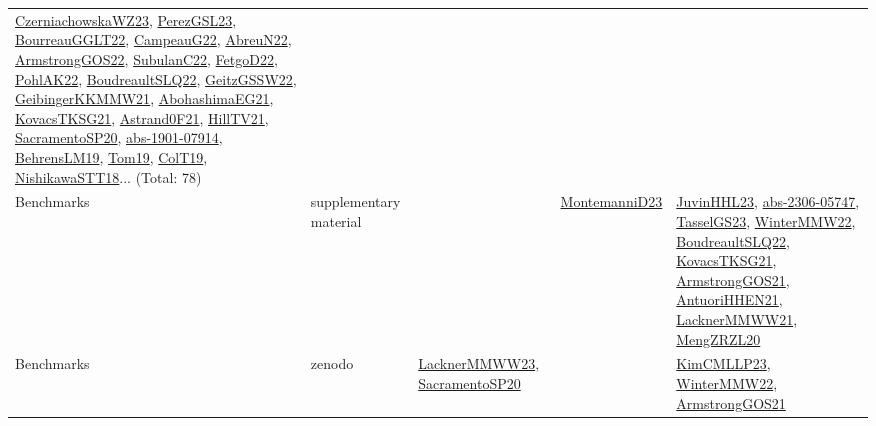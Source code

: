 {\begin{longtable}{lp{3cm}>{\raggedright}p{6cm}>{\raggedright}p{6cm}p{8cm}}
\href{articles/CzerniachowskaWZ23.pdf}{CzerniachowskaWZ23}\cite{CzerniachowskaWZ23}, \href{papers/PerezGSL23.pdf}{PerezGSL23}\cite{PerezGSL23}, \href{articles/BourreauGGLT22.pdf}{BourreauGGLT22}\cite{BourreauGGLT22}, \href{articles/CampeauG22.pdf}{CampeauG22}\cite{CampeauG22}, \href{articles/AbreuN22.pdf}{AbreuN22}\cite{AbreuN22}, \href{papers/ArmstrongGOS22.pdf}{ArmstrongGOS22}\cite{ArmstrongGOS22}, \href{articles/SubulanC22.pdf}{SubulanC22}\cite{SubulanC22}, \href{articles/FetgoD22.pdf}{FetgoD22}\cite{FetgoD22}, \href{articles/PohlAK22.pdf}{PohlAK22}\cite{PohlAK22}, \href{papers/BoudreaultSLQ22.pdf}{BoudreaultSLQ22}\cite{BoudreaultSLQ22}, \href{papers/GeitzGSSW22.pdf}{GeitzGSSW22}\cite{GeitzGSSW22}, \href{papers/GeibingerKKMMW21.pdf}{GeibingerKKMMW21}\cite{GeibingerKKMMW21}, \href{articles/AbohashimaEG21.pdf}{AbohashimaEG21}\cite{AbohashimaEG21}, \href{papers/KovacsTKSG21.pdf}{KovacsTKSG21}\cite{KovacsTKSG21}, \href{papers/Astrand0F21.pdf}{Astrand0F21}\cite{Astrand0F21}, \href{papers/HillTV21.pdf}{HillTV21}\cite{HillTV21}, \href{articles/SacramentoSP20.pdf}{SacramentoSP20}\cite{SacramentoSP20}, \href{articles/abs-1901-07914.pdf}{abs-1901-07914}\cite{abs-1901-07914}, \href{papers/BehrensLM19.pdf}{BehrensLM19}\cite{BehrensLM19}, \href{papers/Tom19.pdf}{Tom19}\cite{Tom19}, \href{papers/ColT19.pdf}{ColT19}\cite{ColT19}, \href{papers/NishikawaSTT18.pdf}{NishikawaSTT18}\cite{NishikawaSTT18}... (Total: 78)\\
Benchmarks & supplementary material &  & \href{articles/MontemanniD23.pdf}{MontemanniD23}\cite{MontemanniD23} & \href{papers/JuvinHHL23.pdf}{JuvinHHL23}\cite{JuvinHHL23}, \href{articles/abs-2306-05747.pdf}{abs-2306-05747}\cite{abs-2306-05747}, \href{papers/TasselGS23.pdf}{TasselGS23}\cite{TasselGS23}, \href{papers/WinterMMW22.pdf}{WinterMMW22}\cite{WinterMMW22}, \href{papers/BoudreaultSLQ22.pdf}{BoudreaultSLQ22}\cite{BoudreaultSLQ22}, \href{papers/KovacsTKSG21.pdf}{KovacsTKSG21}\cite{KovacsTKSG21}, \href{papers/ArmstrongGOS21.pdf}{ArmstrongGOS21}\cite{ArmstrongGOS21}, \href{papers/AntuoriHHEN21.pdf}{AntuoriHHEN21}\cite{AntuoriHHEN21}, \href{papers/LacknerMMWW21.pdf}{LacknerMMWW21}\cite{LacknerMMWW21}, \href{articles/MengZRZL20.pdf}{MengZRZL20}\cite{MengZRZL20}\\
Benchmarks & zenodo & \href{articles/LacknerMMWW23.pdf}{LacknerMMWW23}\cite{LacknerMMWW23}, \href{articles/SacramentoSP20.pdf}{SacramentoSP20}\cite{SacramentoSP20} &  & \href{papers/KimCMLLP23.pdf}{KimCMLLP23}\cite{KimCMLLP23}, \href{papers/WinterMMW22.pdf}{WinterMMW22}\cite{WinterMMW22}, \href{papers/ArmstrongGOS21.pdf}{ArmstrongGOS21}\cite{ArmstrongGOS21}\\

\end{longtable}}
